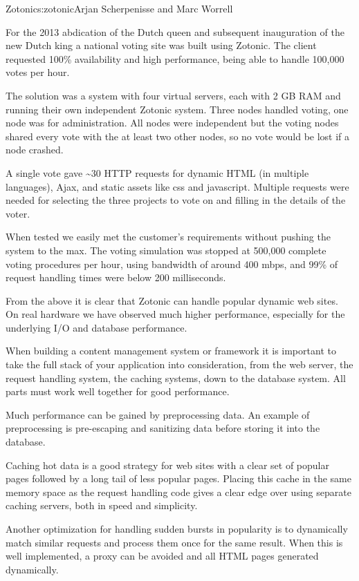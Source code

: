\begin{aosachapter}{Zotonic}{s:zotonic}{Arjan Scherpenisse and Marc Worrell}

For the 2013 abdication of the Dutch queen and subsequent inauguration
of the new Dutch king a national voting site was built using Zotonic.
The client requested 100\% availability and high performance, being able
to handle 100,000 votes per hour.

The solution was a system with four virtual servers, each with 2 GB RAM
and running their own independent Zotonic system. Three nodes handled
voting, one node was for administration. All nodes were independent but
the voting nodes shared every vote with the at least two other nodes, so
no vote would be lost if a node crashed.

A single vote gave \textasciitilde{}30 HTTP requests for dynamic HTML
(in multiple languages), Ajax, and static assets like css and
javascript. Multiple requests were needed for selecting the three
projects to vote on and filling in the details of the voter.

When tested we easily met the customer's requirements without pushing
the system to the max. The voting simulation was stopped at 500,000
complete voting procedures per hour, using bandwidth of around 400 mbps, and
99\% of request handling times were below 200 milliseconds.

From the above it is clear that Zotonic can handle popular dynamic web
sites. On real hardware we have observed much higher performance,
especially for the underlying I/O and database performance.


When building a content management system or framework it is important
to take the full stack of your application into consideration, from the
web server, the request handling system, the caching systems, down to
the database system. All parts must work well together for good
performance.

Much performance can be gained by preprocessing data. An example of
preprocessing is pre-escaping and sanitizing data before storing it into
the database.

Caching hot data is a good strategy for web sites with a clear set of
popular pages followed by a long tail of less popular pages. Placing
this cache in the same memory space as the request handling code gives a
clear edge over using separate caching servers, both in speed and
simplicity.

Another optimization for handling sudden bursts in popularity is to
dynamically match similar requests and process them once for the same
result. When this is well implemented, a proxy can be avoided and all
HTML pages generated dynamically.


\end{aosachapter}
